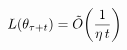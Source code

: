 \documentclass[preview]{standalone}
\begin{document}
\begin{align*}
\special{dvisvgm:raw <g id='unique000'>}L(\theta_{\tau+t}) = \tilde{O}\!\left(\frac{1}{\eta\,t}\right)\special{dvisvgm:raw </g>}
\end{align*}
\end{document}
